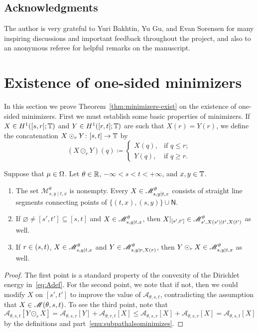 \documentclass[AHL,Unicode,longabstracts]{cedram}
\newcounter{setofcase}
\newcounter{case}[setofcase]
\newcommand*\ssN{\mathsf{N}}
\newcommand*\scM{\mathscr{M}}
\newcommand*\TT{\mathbb{T}}
\newcommand*\RR{\mathbb{R}}
\newcommand{\clA}{\mathcal{A}}
\renewcommand*{\to}{\mathchoice{\longrightarrow}{\rightarrow}{\rightarrow}{\rightarrow}}
\let\oldin\in
\renewcommand{\in}{\mathchoice{\oldin}{\oldin}{\,\oldin\,}{\,\oldin\,}}
\newcommand*\TT{\mathbb{T}}
\newcommand*\RR{\mathbb{R}}
\begin{document}
\subsection*{Acknowledgments}

The author is very grateful to Yuri Bakhtin, Yu Gu, and Evan Sorensen for many inspiring discussions and important feedback throughout the project, and also to an anonymous referee for helpful remarks on the manuscript.

\section{Existence of one-sided minimizers}
\label{sec:Existence}

In this section we prove Theorem~\ref{thm:minimizers-exist} on the existence of one-sided minimizers. First we must establish some basic properties of minimizers. If $X\in H^{1}([s,r];\TT)$ and $Y\in H^{1}([r,t];\TT)$ are such that $X(r)=Y(r)$, we define the concatenation $X\odot_{r}Y\colon[s,t]\to\TT$ by
\begin{equation}\label{eq:odotdef}
(X\odot_{r}Y)(q)\coloneqq
\begin{cases}
X(q), & \text{if }q\le r;\\
Y(q), & \text{if }q\ge r.
\end{cases}
\end{equation}

\begin{prop}\label{prop:basicproperties}
Suppose that $\mu\in\Omega$. Let $\theta\in\RR$, $-\infty<s<t<+\infty$, and $x,y\in\TT$.
\begin{enumerate}
\item \label{enu:straightlines}
The set $\scM_{s,y\mid t,x}^{\theta}$ is nonempty. Every $X\in\scM_{s,y\mid t,x}^{\theta}$ consists of straight line segments connecting points of $\{(t,x),(s,y)\}\cup\ssN$.
\item \label{enu:subpathalsominimizes}
If $\varnothing\ne[s',t']\subseteq[s,t]$ and $X\in\scM_{s,y\mid t,x}^{\theta}$, then $X|_{[s',t']}\in\scM_{s',X(s')\mid t',X(t')}^{\theta}$ as well.
\item \label{enu:pathsurgery}
If $r\in(s,t)$, $X\in\scM_{s,y\mid t,x}^{\theta}$ and $Y\in\scM_{s,y\mid r,X(r)}^{\theta}$, then $Y\odot_{r}X\in\scM_{s,y\mid t,x}^{\theta}$ as well.
\end{enumerate}
\end{prop}

\begin{proof}
The first point is a standard property of the convexity of the Dirichlet energy in~\eqref{eq:Adef}. For the second point, we note that if not, then we could modify $X$ on $[s',t']$ to improve the value of $\clA_{\theta,s,t}$, contradicting the assumption that $X\in\scM(\theta,s,t)$. To see the third point, note that
\[
\clA_{\theta,s,t}[Y\odot_{r}X]=\clA_{\theta,s,r}[Y]+\clA_{\theta,r,t}[X]\le\clA_{\theta,s,r}[X]+\clA_{\theta,s,r}[X]=\clA_{\theta,s,t}[X]
\]
by the definitions and part~\eqref{enu:subpathalsominimizes}.
\end{proof}
\end{document}
